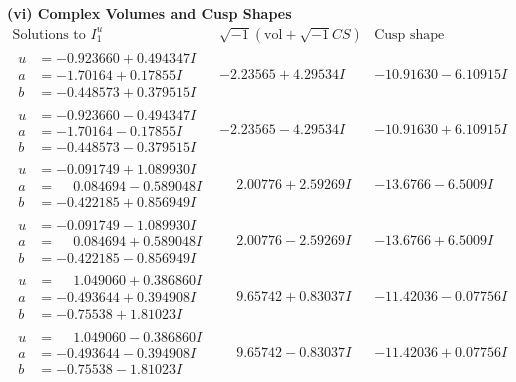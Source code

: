 \documentclass[1p]{elsarticle_modified}
\theoremstyle{definition}
\newcommand{\I}{\sqrt{-1}}
\begin{document}
\newpage\flushleft \textbf{(vi) Complex Volumes and Cusp Shapes}
$$\begin{array}{c|c|c}  
\text{Solutions to }I^u_{1}& \I (\text{vol} + \sqrt{-1}CS) & \text{Cusp shape}\\
 \hline 
\begin{aligned}
u &= -0.923660 + 0.494347 I \\
a &= -1.70164 + 0.17855 I \\
b &= -0.448573 + 0.379515 I\end{aligned}
 & -2.23565 + 4.29534 I & -10.91630 - 6.10915 I \\ \hline\begin{aligned}
u &= -0.923660 - 0.494347 I \\
a &= -1.70164 - 0.17855 I \\
b &= -0.448573 - 0.379515 I\end{aligned}
 & -2.23565 - 4.29534 I & -10.91630 + 6.10915 I \\ \hline\begin{aligned}
u &= -0.091749 + 1.089930 I \\
a &= \phantom{-}0.084694 - 0.589048 I \\
b &= -0.422185 + 0.856949 I\end{aligned}
 & \phantom{-}2.00776 + 2.59269 I & -13.6766 - 6.5009 I \\ \hline\begin{aligned}
u &= -0.091749 - 1.089930 I \\
a &= \phantom{-}0.084694 + 0.589048 I \\
b &= -0.422185 - 0.856949 I\end{aligned}
 & \phantom{-}2.00776 - 2.59269 I & -13.6766 + 6.5009 I \\ \hline\begin{aligned}
u &= \phantom{-}1.049060 + 0.386860 I \\
a &= -0.493644 + 0.394908 I \\
b &= -0.75538 + 1.81023 I\end{aligned}
 & \phantom{-}9.65742 + 0.83037 I & -11.42036 - 0.07756 I \\ \hline\begin{aligned}
u &= \phantom{-}1.049060 - 0.386860 I \\
a &= -0.493644 - 0.394908 I \\
b &= -0.75538 - 1.81023 I\end{aligned}
 & \phantom{-}9.65742 - 0.83037 I & -11.42036 + 0.07756 I \\ \hline\begin{aligned}

\end{aligned}
\end{array}$$
\end{document}
